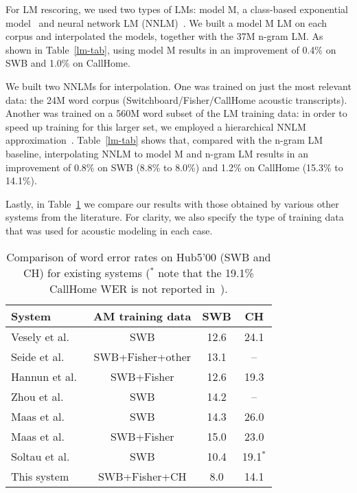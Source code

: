 \documentclass[a4paper]{article}
\begin{document}
For LM rescoring, we used two types of LMs: model M, a class-based
exponential model~\cite{chen09} and neural network LM
(NNLM)~\cite{Bengio03,Emami06,Schwenk07,emamiasru07}.  We built a
model M LM on each corpus and interpolated the models, together with
the 37M n-gram LM.  As shown in Table~\ref{lm-tab}, using model M
results in an improvement of 0.4\% on SWB and 1.0\% on CallHome.  

We built two NNLMs for interpolation. One was trained on just the most
relevant data: the 24M word corpus (Switchboard/Fisher/CallHome
acoustic transcripts).  Another was trained on a 560M word subset of
the LM training data: in order to speed up training for this larger
set, we employed a hierarchical NNLM
approximation~\cite{Emami06,kuo2012large}.  Table~\ref{lm-tab} shows
that, compared with the n-gram LM baseline, interpolating NNLM to
model M and n-gram LM results in an improvement of 0.8\% on SWB (8.8\%
to 8.0\%) and 1.2\% on CallHome (15.3\% to 14.1\%).

 
Lastly, in Table~\ref{comparison} we compare our results with those
obtained by various other systems from the literature. For clarity, we
also specify the type of training data that was used for acoustic
modeling in each case.

\begin{table}[htpb!]
\begin{center}
\begin{tabular}{|l|c|c|c|} \hline
System                          & AM training data & SWB & CH\\ \hline 
Vesely et al.~\cite{vesely13}   & SWB           & 12.6  & 24.1 \\ \hline
Seide et al.~\cite{seide14}     & SWB+Fisher+other    & 13.1  & --   \\ \hline
Hannun et al.~\cite{hannun14}   & SWB+Fisher    & 12.6  & 19.3 \\ \hline
Zhou et al.~\cite{zhou14}       & SWB           & 14.2  & --   \\ \hline
Maas et al.~\cite{maas14}       & SWB           & 14.3  & 26.0 \\ \hline
Maas et al.~\cite{maas14}       & SWB+Fisher    & 15.0  & 23.0 \\ \hline
Soltau et al.~\cite{soltau14}   & SWB           & 10.4  & 19.1$^*$\\ \hline
This system                     & SWB+Fisher+CH & 8.0   & 14.1\\ \hline
\end{tabular}
\end{center}
\caption{\label{comparison}
Comparison of word error rates on Hub5'00 (SWB and CH) for existing systems ($^*$ note that 
the 19.1\% CallHome WER is not reported in~\cite{soltau14}).}
\end{table}
\end{document}

